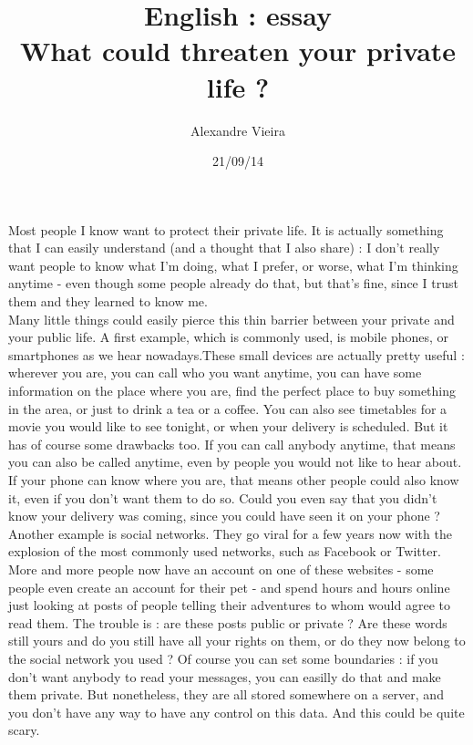 \documentclass{article}
\title{English : essay\\What could threaten your private life ?}
\author{Alexandre Vieira}
\date{21/09/14}
\begin{document}
\maketitle

Most people I know want to protect their private life. It is actually something that I can easily understand (and a thought that I also share) : I don't really want people to know what I'm doing, what I prefer, or worse, what I'm thinking anytime - even though some people already do that, but that's fine, since I trust them and they learned to know me.\\
Many little things could easily pierce this thin barrier between your private and your public life. A first example, which is commonly used, is mobile phones, or smartphones as we hear nowadays.These small devices are actually pretty useful : wherever you are, you can call who you want anytime, you can have some information on the place where you are, find the perfect place to buy something in the area, or just to drink a tea or a coffee. You can also see timetables for a movie you would like to see tonight, or when your delivery is scheduled.
But it has of course some drawbacks too. If you can call anybody anytime, that means you can also be called anytime, even by people you would not like to hear about. If your phone can know where you are, that means other people could also know it, even if you don't want them to do so. Could you even say that you didn't know your delivery was coming, since you could have seen it on your phone ? \\
Another example is social networks. They go viral for a few years now with the explosion of the most commonly used networks, such as Facebook or Twitter. More and more people now have an account on one of these websites - some people even create an account for their pet - and spend hours and hours online just looking at posts of people telling their adventures to whom would agree to read them. The trouble is : are these posts public or private ? Are these words still yours and do you still have all your rights on them, or do they now belong to the social network you used ? Of course you can set some boundaries : if you don't want anybody to read your messages, you can easilly do that and make them private. But nonetheless, they are all stored somewhere on a server, and you don't have any way to have any control on this data. And this could be quite scary.
\end{document}
